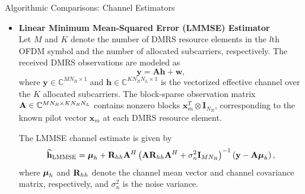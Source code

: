 \documentclass[xcolor=dvipsnames,12pt]{beamer}
\begin{document}
\begin{frame}{Algorithmic Comparisons: Channel Estimators}
\begin{footnotesize}
    \begin{itemize}
        \item[2.] \textbf{Linear Minimum Mean-Squared Error (LMMSE) Estimator} \\

        Let $M$ and $K$ denote the number of DMRS resource elements in the $l$th OFDM symbol and the number of allocated subcarriers, respectively. The received DMRS observations are modeled as
        \begin{equation}
            \mathbf{y} = \mathbf{A}\mathbf{h} + \mathbf{w},
        \end{equation}
        where $\mathbf{y} \in \mathbb{C}^{M N_R \times 1}$ and $\mathbf{h} \in \mathbb{C}^{K N_R N_L \times 1}$ is the vectorized effective channel over the $K$ allocated subcarriers.  The block-sparse observation matrix ${\bf A} \in \mathbb{C}^{M N_R \times K N_R N_L}$ contains nonzero blocks $\mathbf{x}_m^T \otimes \mathbf{I}_{N_R}$, corresponding to the known pilot vector $\mathbf{x}_m$ at each DMRS resource element.

        The LMMSE channel estimate is given by
        \begin{equation}
        {\widehat{{\bf h}}}_{\rm{LMMSE}} = {\boldsymbol \mu}_h + {\bf R}_{hh} {\bf A}^H \left( {\bf A} {\bf R}_{hh} {\bf A}^H + \sigma_n^2 {\bf I}_{M N_R} \right)^{-1} \left( {\bf y} - {\bf A} {\boldsymbol \mu}_h \right),
        \end{equation}
        where ${\boldsymbol \mu}_h$ and ${\bf R}_{hh}$ denote the channel mean vector and channel covariance matrix, respectively, and $\sigma_n^2$ is the noise variance.
    \end{itemize}

\end{footnotesize}
\end{frame}
\end{document}
